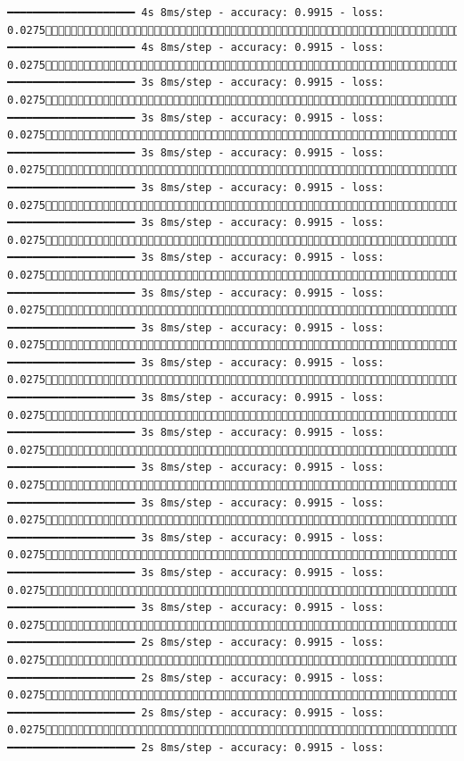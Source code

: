 \documentclass[
  letterpaper,
  DIV=11,
  numbers=noendperiod]{scrreprt}
\begin{document}
\begin{verbatim}
━━━━━━━━━━━━━━━━━━━━ 4s 8ms/step - accuracy: 0.9915 - loss: 0.02751359/1875 ━━━━━━━━━━━━━━━━━━━━ 4s 8ms/step - accuracy: 0.9915 - loss: 0.02751366/1875 ━━━━━━━━━━━━━━━━━━━━ 3s 8ms/step - accuracy: 0.9915 - loss: 0.02751374/1875 ━━━━━━━━━━━━━━━━━━━━ 3s 8ms/step - accuracy: 0.9915 - loss: 0.02751382/1875 ━━━━━━━━━━━━━━━━━━━━ 3s 8ms/step - accuracy: 0.9915 - loss: 0.02751390/1875 ━━━━━━━━━━━━━━━━━━━━ 3s 8ms/step - accuracy: 0.9915 - loss: 0.02751398/1875 ━━━━━━━━━━━━━━━━━━━━ 3s 8ms/step - accuracy: 0.9915 - loss: 0.02751406/1875 ━━━━━━━━━━━━━━━━━━━━ 3s 8ms/step - accuracy: 0.9915 - loss: 0.02751413/1875 ━━━━━━━━━━━━━━━━━━━━ 3s 8ms/step - accuracy: 0.9915 - loss: 0.02751421/1875 ━━━━━━━━━━━━━━━━━━━━ 3s 8ms/step - accuracy: 0.9915 - loss: 0.02751428/1875 ━━━━━━━━━━━━━━━━━━━━ 3s 8ms/step - accuracy: 0.9915 - loss: 0.02751435/1875 ━━━━━━━━━━━━━━━━━━━━ 3s 8ms/step - accuracy: 0.9915 - loss: 0.02751443/1875 ━━━━━━━━━━━━━━━━━━━━ 3s 8ms/step - accuracy: 0.9915 - loss: 0.02751450/1875 ━━━━━━━━━━━━━━━━━━━━ 3s 8ms/step - accuracy: 0.9915 - loss: 0.02751457/1875 ━━━━━━━━━━━━━━━━━━━━ 3s 8ms/step - accuracy: 0.9915 - loss: 0.02751465/1875 ━━━━━━━━━━━━━━━━━━━━ 3s 8ms/step - accuracy: 0.9915 - loss: 0.02751473/1875 ━━━━━━━━━━━━━━━━━━━━ 3s 8ms/step - accuracy: 0.9915 - loss: 0.02751480/1875 ━━━━━━━━━━━━━━━━━━━━ 3s 8ms/step - accuracy: 0.9915 - loss: 0.02751488/1875 ━━━━━━━━━━━━━━━━━━━━ 2s 8ms/step - accuracy: 0.9915 - loss: 0.02751496/1875 ━━━━━━━━━━━━━━━━━━━━ 2s 8ms/step - accuracy: 0.9915 - loss: 0.02751504/1875 ━━━━━━━━━━━━━━━━━━━━ 2s 8ms/step - accuracy: 0.9915 - loss: 0.02751511/1875 ━━━━━━━━━━━━━━━━━━━━ 2s 8ms/step - accuracy: 0.9915 - loss: 
\end{verbatim}
\end{document}
